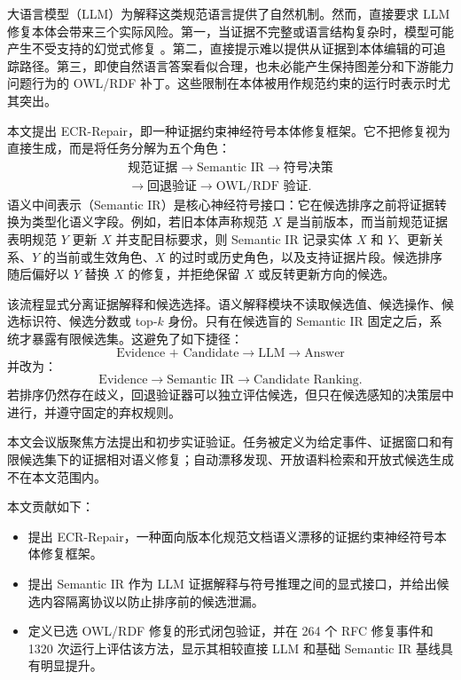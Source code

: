 \documentclass[conference]{IEEEtran}
\begin{document}
大语言模型（LLM）为解释这类规范语言提供了自然机制。然而，直接要求 LLM 修复本体会带来三个实际风险。第一，当证据不完整或语言结构复杂时，模型可能产生不受支持的幻觉式修复 \cite{ji2023hallucination}。第二，直接提示难以提供从证据到本体编辑的可追踪路径。第三，即使自然语言答案看似合理，也未必能产生保持图差分和下游能力问题行为的 OWL/RDF 补丁。这些限制在本体被用作规范约束的运行时表示时尤其突出。

本文提出 ECR-Repair，即一种证据约束神经符号本体修复框架。它不把修复视为直接生成，而是将任务分解为五个角色：
\[
\begin{gathered}
\text{规范证据}
\rightarrow
\text{Semantic IR}
\rightarrow
\text{符号决策}\\
\rightarrow
\text{回退验证}
\rightarrow
\text{OWL/RDF 验证}.
\end{gathered}
\]
语义中间表示（Semantic IR）是核心神经符号接口：它在候选排序之前将证据转换为类型化语义字段。例如，若旧本体声称规范 $X$ 是当前版本，而当前规范证据表明规范 $Y$ 更新 $X$ 并支配目标要求，则 Semantic IR 记录实体 $X$ 和 $Y$、更新关系、$Y$ 的当前或生效角色、$X$ 的过时或历史角色，以及支持证据片段。候选排序随后偏好以 $Y$ 替换 $X$ 的修复，并拒绝保留 $X$ 或反转更新方向的候选。

该流程显式分离证据解释和候选选择。语义解释模块不读取候选值、候选操作、候选标识符、候选分数或 top-$k$ 身份。只有在候选盲的 Semantic IR 固定之后，系统才暴露有限候选集。这避免了如下捷径：
\[
\text{Evidence + Candidate} \rightarrow \text{LLM} \rightarrow \text{Answer}
\]
并改为：
\[
\text{Evidence} \rightarrow \text{Semantic IR} \rightarrow \text{Candidate Ranking}.
\]
若排序仍然存在歧义，回退验证器可以独立评估候选，但只在候选感知的决策层中进行，并遵守固定的弃权规则。

本文会议版聚焦方法提出和初步实证验证。任务被定义为给定事件、证据窗口和有限候选集下的证据相对语义修复；自动漂移发现、开放语料检索和开放式候选生成不在本文范围内。

本文贡献如下：
\begin{itemize}
    \item 提出 ECR-Repair，一种面向版本化规范文档语义漂移的证据约束神经符号本体修复框架。
    \item 提出 Semantic IR 作为 LLM 证据解释与符号推理之间的显式接口，并给出候选内容隔离协议以防止排序前的候选泄漏。
    \item 定义已选 OWL/RDF 修复的形式闭包验证，并在 264 个 RFC 修复事件和 1320 次运行上评估该方法，显示其相较直接 LLM 和基础 Semantic IR 基线具有明显提升。
\end{itemize}
\end{document}

